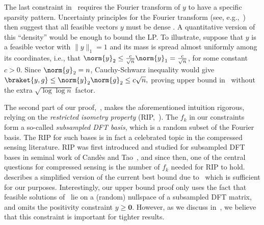 The last constraint in~ requires the Fourier transform of \(y\) to have a specific sparsity pattern. Uncertainty principles for the Fourier transform (see, e.g.,~\cite{bandeira2018discrete}) then suggest that all feasible vectors \(y\) must be dense \cite{demanet2014scaling}.
A quantitative version of this ``density'' would be enough to bound the LP.
To illustrate, suppose that $y$ is a feasible vector with $\|y\|_1 = 1$ and its mass is spread almost uniformly among its coordinates, i.e., that
\(\norm{y}_2 \leq \frac{c}{\sqrt{n}} \norm{y}_1 = \frac{c}{\sqrt{n}}\), for some constant \(c > 0\). Since \(\norm{g}_2 = n\), Cauchy-Schwarz inequality would give \(\braket{y, g} \leq \norm{y}_2 \norm{g}_2 \leq c\sqrt{n},\) proving upper bound in~ without the extra \(\sqrt{\log \log n}\) factor.

The second part of our proof,~, makes the aforementioned intuition rigorous, relying on the \textit{restricted isometry property} (RIP,~).
The $f_k$ in our constraints form a so-called \emph{subsampled DFT basis}, which is a random subset of the Fourier basis.
The RIP for such bases is in fact a celebrated topic in the compressed sensing literature. RIP was first introduced and studied for subsampled DFT bases in seminal work of Candès and Tao~\cite{candes2006near},
and since then, one of the central 
questions for compressed sensing is 
the number of $f_k$ needed for RIP to hold. 
 describes a simplified version of the current best bound due to~\cite{haviv2017restricted} which is sufficient for our purposes.
Interestingly, our upper bound proof only uses the fact that feasible solutions of~ lie on a (random) nullspace of a subsampled DFT matrix, and omits the positivity constraint \(y \geq \mathbf{0}\). However, as we discuss in~, we believe that this constraint is important for tighter results.
